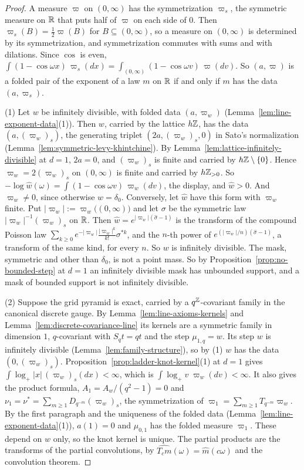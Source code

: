 \begin{proof}
A measure $\varpi$ on $(0,\infty)$ has the symmetrization $\varpi_s$, the symmetric measure on
$\mathbb{R}$ that puts half of $\varpi$ on each side of $0$. Then $\varpi_s(B) = \tfrac12\varpi(B)$ for
$B \subseteq (0,\infty)$, so a measure on $(0,\infty)$ is determined by its symmetrization, and
symmetrization commutes with sums and with dilations. Since $\cos$ is even,
$\int(1 - \cos\omega x)\,\varpi_s(dx) = \int_{(0,\infty)}(1 - \cos\omega v)\,\varpi(dv)$. So
$(a, \varpi)$ is a folded pair of the exponent of a law $m$ on $\mathbb{R}$ if and only if $m$ has the
data $(a, \varpi_s)$.

(1) Let $w$ be infinitely divisible, with folded data $(a, \varpi_w)$
(Lemma~\ref{lem:line-exponent-data}(1)). Then $w$, carried by the lattice $h\mathbb{Z}$, has the data
$(a, (\varpi_w)_s)$, the generating triplet $(2a, (\varpi_w)_s, 0)$ in Sato's normalization
(Lemma~\ref{lem:symmetric-levy-khintchine}). By
Lemma~\ref{lem:lattice-infinitely-divisible} at $d = 1$, $2a = 0$, and $(\varpi_w)_s$ is finite and
carried by $h\mathbb{Z} \setminus \{0\}$. Hence $\varpi_w = 2(\varpi_w)_s$ on $(0,\infty)$ is finite and
carried by $h\mathbb{Z}_{>0}$. So $-\log\widehat w(\omega) = \int(1 - \cos\omega v)\,\varpi_w(dv)$, the
display, and $\widehat w > 0$. And $\varpi_w \ne 0$, since otherwise $w = \delta_0$.
Conversely, let $\widehat w$ have this form with $\varpi_w$ finite. Put
$|\varpi_w| := \varpi_w\bigl((0,\infty)\bigr)$ and let $\sigma$ be the symmetric law
$|\varpi_w|^{-1}(\varpi_w)_s$ on $\mathbb{R}$. Then $\widehat w = e^{|\varpi_w|(\widehat\sigma - 1)}$
is the transform of the compound Poisson law
$\sum_{k \ge 0}e^{-|\varpi_w|}\tfrac{|\varpi_w|^k}{k!}\sigma^{*k}$, and the $n$-th power of
$e^{(|\varpi_w|/n)(\widehat\sigma - 1)}$, a transform of the same kind, for every $n$. So $w$ is
infinitely divisible. The mask, symmetric and other than $\delta_0$, is not a point mass. So by
Proposition~\ref{prop:no-bounded-step} at $d = 1$ an infinitely divisible mask has unbounded
support, and a mask of bounded support is not infinitely divisible.

(2) Suppose the grid pyramid is exact, carried by a $q^{\mathbb{Z}}$-covariant family in the
canonical discrete gauge. By Lemma~\ref{lem:line-axioms-kernels} and
Lemma~\ref{lem:discrete-covariance-line} its kernels are a symmetric family in dimension $1$,
$q$-covariant with $S_qt = qt$ and the step $\mu_{1,q} = w$. Its step $w$ is infinitely divisible
(Lemma~\ref{lem:family-structure}), so by (1) $w$ has the data $(0, (\varpi_w)_s)$.
Proposition~\ref{prop:ladder-knot-kernel}(1) at $d = 1$ gives
$\int\log_+|x|\,(\varpi_w)_s(dx) < \infty$, which is $\int\log_+v\;\varpi_w(dv) < \infty$. It
also gives the product formula, $A_1 = A_w/(q^2 - 1) = 0$ and
$\nu_1 = \nu^* = \sum_{m \ge 1}D_{q^{-m}}(\varpi_w)_s$, the symmetrization of
$\varpi_1 = \sum_{m \ge 1}T_{q^{-m}}\varpi_w$. By the first paragraph and the uniqueness of the
folded data (Lemma~\ref{lem:line-exponent-data}(1)), $a(1) = 0$ and $\mu_{0,1}$ has the folded
measure $\varpi_1$. These depend on $w$ only, so the knot kernel is unique. The partial products
are the transforms of the partial convolutions, by $\widehat{T_c m}(\omega) = \widehat m(c\omega)$
and the convolution theorem.


\end{proof}
